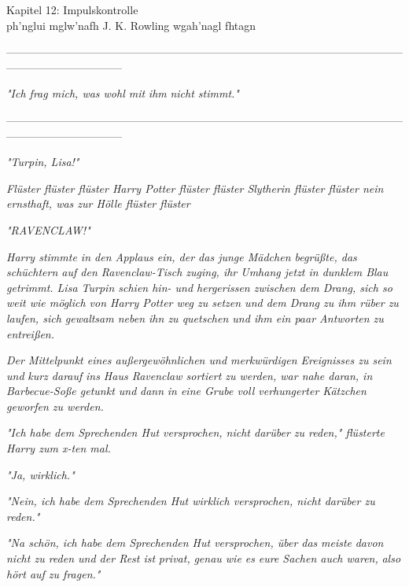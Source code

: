 

\hypertarget{impulskontrolle}{%

Kapitel 12: Impulskontrolle\\

ph'nglui mglw'nafh J. K. Rowling wgah'nagl fhtagn

--------------------------------------------------------------------------------------------------------------------------------------------

\emph{\emph{"Ich frag mich, was wohl mit}} \emph{ihm} \emph{\emph{nicht stimmt."}}

--------------------------------------------------------------------------------------------------------------------------------------------

\emph{"Turpin, Lisa!"}

\emph{Flüster flüster flüster Harry Potter flüster flüster Slytherin flüster flüster nein ernsthaft, was zur Hölle flüster flüster}

\emph{"RAVENCLAW!"}

\emph{Harry stimmte in den Applaus ein, der das junge Mädchen begrüßte, das schüchtern auf den Ravenclaw-Tisch zuging, ihr Umhang jetzt in dunklem Blau getrimmt. Lisa Turpin schien hin- und hergerissen zwischen dem Drang, sich so weit wie möglich von Harry Potter weg zu setzen und dem Drang zu ihm rüber zu laufen, sich gewaltsam neben ihn zu quetschen und ihm ein paar Antworten zu entreißen.}

\emph{Der Mittelpunkt eines außergewöhnlichen und merkwürdigen Ereignisses zu sein und} \emph{kurz darauf} \emph{ins Haus Ravenclaw sortiert zu werden, war nahe daran, in Barbecue-Soße getunkt und} \emph{dann} \emph{in eine Grube voll verhungerter Kätzchen geworfen zu werden.}

\emph{"Ich habe dem Sprechenden Hut versprochen, nicht darüber zu reden," flüsterte Harry zum x-ten mal.}

\emph{"Ja, wirklich."}

\emph{"Nein, ich habe dem Sprechenden Hut wirklich versprochen, nicht darüber zu reden."}

\emph{"Na schön, ich habe dem Sprechenden Hut versprochen, über das} \emph{\emph{meiste}} \emph{davon nicht zu reden und der Rest ist} \emph{\emph{privat,}} \emph{genau wie es} \emph{\emph{eure Sachen auch waren,}} \emph{also} \emph{\emph{hört auf zu fragen.}"}

}
